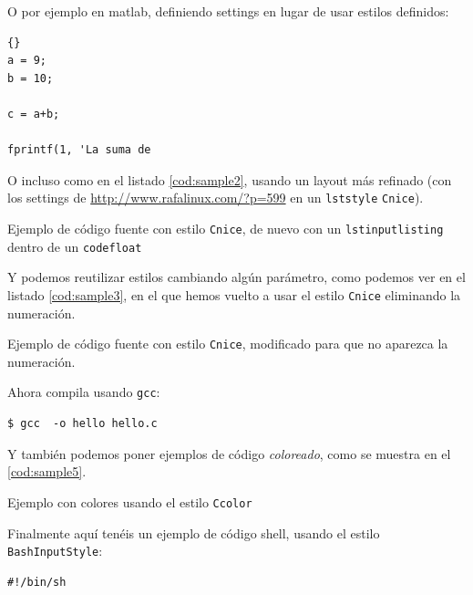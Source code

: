 \documentclass[spanish,openright]{book}
\begin{document}
\begin{appendices}
O por ejemplo en matlab, definiendo settings en lugar de usar estilos
definidos:

\lstset{language=matlab}
\lstset{tabsize=2}
\lstset{commentstyle=\textit}
\lstset{stringstyle=\ttfamily, basicstyle=\small}
\begin{lstlisting}[frame=trbl]{}
a = 9;
b = 10;

c = a+b;

fprintf(1, 'La suma de
\end{lstlisting}

O incluso como en el listado \ref{cod:sample2}, usando un layout más refinado (con
los settings de \url{http://www.rafalinux.com/?p=599} en un \texttt{lststyle}
\texttt{Cnice}).


\begin{codefloat}

\caption{Ejemplo de código fuente con estilo \texttt{Cnice}, de nuevo
con un \texttt{lstinputlisting} dentro de un \texttt{codefloat}}
\label{cod:sample2}
\end{codefloat}

Y podemos reutilizar estilos cambiando algún parámetro, como podemos ver
en el listado \ref{cod:sample3}, en el que hemos vuelto a usar el estilo
\texttt{Cnice} eliminando la numeración.


\begin{codefloat}

\caption{Ejemplo de código fuente con estilo \texttt{Cnice}, modificado
para que no aparezca la numeración.}
\label{cod:sample3}
\end{codefloat}


\noindent
Ahora compila usando \texttt{gcc}:


\begin{lstlisting}[style=console, numbers=none]
$ gcc  -o hello hello.c
\end{lstlisting}

Y también podemos poner ejemplos de código \textit{coloreado}, como se
muestra en el \ref{cod:sample5}.

\begin{codefloat}

\caption{Ejemplo con colores usando el estilo \texttt{Ccolor}}
\label{cod:sample5}
\end{codefloat}

Finalmente aquí tenéis un ejemplo de código shell, usando el estilo
\texttt{BashInputStyle}:

\begin{lstlisting}[style=BashInputStyle, numbers=none]
#!/bin/sh


\end{lstlisting}
\end{appendices}
\end{document}
